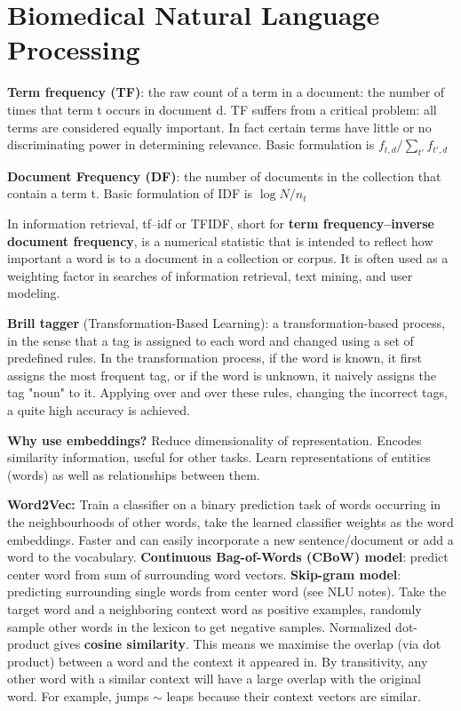 \documentclass[11pt]{article}
\begin{document}
\section{Biomedical Natural Language Processing}
\par \textbf{Term frequency (TF)}: the raw count of a term in a document: the number of times that term t occurs in document d. TF suffers from a critical problem: all terms are considered equally important. In fact certain terms have little or no discriminating power in determining relevance. Basic formulation is $f_{t,d} / \sum_{t'} f_{t',d}$
\par \textbf{Document Frequency (DF)}: the number of documents in the collection that contain a term t. Basic formulation of IDF is $\log N / n_t$
\par In information retrieval, tf–idf or TFIDF, short for \textbf{term frequency–inverse document frequency}, is a numerical statistic that is intended to reflect how important a word is to a document in a collection or corpus. It is often used as a weighting factor in searches of information retrieval, text mining, and user modeling.
\par \textbf{Brill tagger} (Transformation-Based Learning): a transformation-based process, in the sense that a tag is assigned to each word and changed using a set of predefined rules. In the transformation process, if the word is known, it first assigns the most frequent tag, or if the word is unknown, it naively assigns the tag "noun" to it. Applying over and over these rules, changing the incorrect tags, a quite high accuracy is achieved.
\par \textbf{Why use embeddings?} Reduce dimensionality of representation. Encodes similarity information, useful for other tasks. Learn representations of entities (words) as well as relationships between them.
\par \textbf{Word2Vec:} Train a classifier on a binary prediction task of words occurring in the neighbourhoods of other words, take the learned classifier weights as the word embeddings. Faster and can easily incorporate a new sentence/document or add a word to the vocabulary. \textbf{Continuous Bag-of-Words (CBoW) model}: predict center word from sum of surrounding word vectors. \textbf{Skip-gram model}: predicting surrounding single words from center word (see NLU notes). Take the target word and a neighboring context word as positive examples, randomly sample other words in the lexicon to get negative samples. Normalized dot-product gives \textbf{cosine similarity}. This means we maximise the overlap (via dot product) between a word and the context it appeared in. By transitivity, any other word with a similar context will have a large overlap with the original word. For example, jumps $\sim$ leaps because their context vectors are similar.
\end{document}
